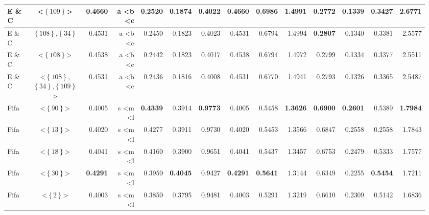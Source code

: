 \documentclass[runningheads,a4paper]{llncs}
\begin{document}
\begin{table}
\begin{tabularx}{\textwidth}{l@{}c@{}R@{}R@{}R@{}R@{}R@{}R@{}R@{}R@{}R@{}R@{}R@{}R@{}}
        \midrule
    E \& C   & \textless$\left\{\text{109}\right\}$\textgreater & \textbf{0.4660} & a \textless b \textless c & 0.2520 & \textbf{0.1874} & 0.4022 & \textbf{0.4660} & 0.6986 & 1.4991 & 0.2772 & 0.1339 & 0.3427 & 2.6771 \\
        \midrule
    E \& C   & $\left\{\text{108}\right\}$,$\left\{\text{34}\right\}$ & 0.4531 & a \textless b \textless c & 0.2450 & 0.1823 & 0.4023 & 0.4531 & 0.6794 & 1.4994 & \textbf{0.2807} & 0.1340 & 0.3381 & 2.5577 \\
        \midrule
    E \& C   & \textless$\left\{\text{108}\right\}$\textgreater  & 0.4538 & a \textless b \textless c & 0.2442 & 0.1823 & 0.4017 & 0.4538 & 0.6794 & 1.4972 & 0.2799 & 0.1334 & 0.3377 & 2.5511 \\
        \midrule
    E \& C   & \textless$\left\{\text{108}\right\}$,$\left\{\text{34}\right\}$,$\left\{\text{109}\right\}$\textgreater & 0.4531 & a \textless b \textless c & 0.2436 & 0.1816 & 0.4008 & 0.4531 & 0.6770 & 1.4941 & 0.2793 & 0.1326 & 0.3365 & 2.5487 \\
	    \midrule
	    \midrule
	Fifa & \textless$\left\{\text{90}\right\}$\textgreater & 0.4005 & s \textless m \textless l & \textbf{0.4339} & 0.3914 & \textbf{0.9773} & 0.4005 & 0.5458 & \textbf{1.3626} & \textbf{0.6900} & \textbf{0.2601} & 0.5389 & \textbf{1.7984} \\
	    \midrule
    	Fifa & \textless$\left\{\text{13}\right\}$\textgreater & 0.4020 & s \textless m \textless l & 0.4277 & 0.3911 & 0.9730 & 0.4020 & 0.5453 & 1.3566 & 0.6847 & 0.2558 & 0.2558 & 1.7843 \\
    	    \midrule
    Fifa & \textless$\left\{\text{18}\right\}$\textgreater & 0.4041 & s \textless m \textless l & 0.4160 & 0.3900 & 0.9651 & 0.4041 & 0.5437 & 1.3457 & 0.6753 & 0.2479 & 0.5333 & 1.7577 \\
        \midrule
    Fifa & \textless$\left\{\text{30}\right\}$\textgreater & \textbf{0.4291} & s \textless m \textless l & 0.3950 & \textbf{0.4045} & 0.9427 & \textbf{0.4291} & \textbf{0.5641} & 1.3144 & 0.6349 & 0.2255 & \textbf{0.5454} & 1.7211 \\
        \midrule
    Fifa & \textless$\left\{\text{2}\right\}$\textgreater & 0.4003 & s \textless m \textless l & 0.3850 & 0.3795 & 0.9481 & 0.4003 & 0.5291 & 1.3219 & 0.6610 & 0.2309 & 0.5142 & 1.6836 \\
        \bottomrule
    \end{tabularx}%
  \label{tab:results}%
\end{table}%
\end{document}

